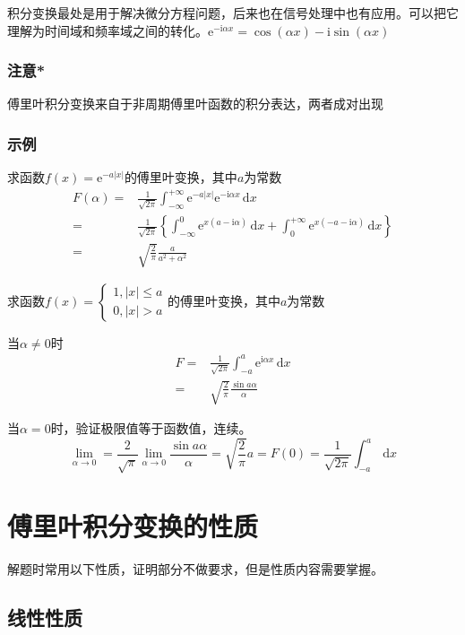 积分变换最处是用于解决微分方程问题，后来也在信号处理中也有应用。可以把它理解为时间域和频率域之间的转化。\(\mathrm{e}^{-\mathrm{i}\alpha x}=\cos(\alpha x)-\mathrm{i}\sin(\alpha x)\)

\subsubsection{注意*}

傅里叶积分变换来自于非周期傅里叶函数的积分表达，两者成对出现

\subsubsection{示例}

求函数\(f(x)=\mathrm{e}^{-a|x|}\)的傅里叶变换，其中\(a\)为常数
\begin{align*}
F(\alpha)=&\frac{1}{\sqrt{2\pi}}\int_{-\infty}^{+\infty}\mathrm{e}^{-a|x|}\mathrm{e}^{-\mathrm{i}\alpha x}\,\mathrm{d}x\\
=&\frac{1}{\sqrt{2\pi}}\left\{\int_{-\infty}^{0}\mathrm{e}^{x(a-\mathrm{i}\alpha)}\,\mathrm{d}x+\int_{0}^{+\infty}\mathrm{e}^{x\left(-a-\mathrm{i}\alpha\right)}\,\mathrm{d}x\right\}\\
=&\sqrt{\frac{2}{\pi}}\frac{a}{a^2+\alpha^2}
\end{align*}

求函数\(f(x)=\begin{cases}1,|x|\leq a\\0,|x|>a\end{cases}\)的傅里叶变换，其中\(a\)为常数

当\(\alpha\neq0\)时
\begin{align*}
F=&\frac{1}{\sqrt{2\pi}}\int_{-a}^a\mathrm{e}^{\mathrm{i}\alpha x}\,\mathrm{d}x\\
=&\sqrt{\frac{2}{\pi}}\frac{\sin a\alpha}{\alpha}
\end{align*}

当\(\alpha=0\)时，验证极限值等于函数值，连续。
\[
\lim_{\alpha\to0}=\frac{2}{\sqrt{\pi}}\lim_{\alpha\to0}\frac{\sin a\alpha}{\alpha}=\sqrt{\frac{2}{\pi}}a=F(0)=\frac{1}{\sqrt{2\pi}}\int_{-a}^a\,\mathrm{d}x
\]

\section{傅里叶积分变换的性质}

解题时常用以下性质，证明部分不做要求，但是性质内容需要掌握。

\subsection{线性性质}

